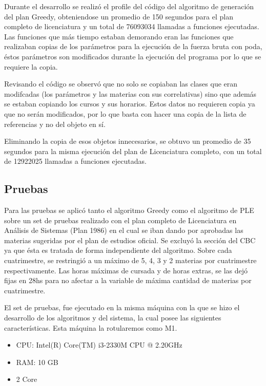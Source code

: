 \documentclass[a4paper]{article}
\begin{document}
Durante el desarrollo se realizó el profile del código del algoritmo de generación del plan Greedy, obteniendose un promedio de 150 segundos para el plan completo de licenciatura y un total de 76093034 llamadas a funciones ejecutadas. Las funciones que más tiempo estaban demorando eran las funciones que realizaban copias de los parámetros para la ejecución de la fuerza bruta con poda, éstos parámetros son modificados durante la ejecución del programa por lo que se requiere la copia.

Revisando el código se observó que no solo se copiaban las clases que eran modifcadas (los parámetros y las materias con sus correlativas) sino que además se estaban copiando los cursos y sus horarios. Estos datos no requieren copia ya que no serán modificados, por lo que basta con hacer una copia de la lista de referencias y no del objeto en sí.

Eliminando la copia de esos objetos innecesarios, se obtuvo un promedio de 35 segundos para la misma ejecución del plan de Licenciatura completo, con un total de 12922025 llamadas a funciones ejecutadas.


\subsection{Pruebas}

Para las pruebas se aplicó tanto el algoritmo Greedy como el algoritmo de PLE sobre un set de pruebas realizado con el plan completo de Licenciatura en Análisis de Sistemas (Plan 1986) en el cual se iban dando por aprobadas las materias sugeridas por el plan de estudios oficial. Se excluyó la sección del CBC ya que ésta es tratada de forma independiente del algoritmo. Sobre cada cuatrimestre, se restringió a un máximo de 5, 4, 3 y 2 materias por cuatrimestre respectivamente. Las horas máximas de cursada y de horas extras, se las dejó fijas en 28hs para no afectar a la variable de máxima cantidad de materias por cuatrimestre.

El set de pruebas, fue ejecutado en la misma máquina con la que se hizo el desarrollo de los algoritmos y del sistema, la cual posee las siguientes características. Esta máquina la rotularemos como M1.

\begin{itemize}
	\item CPU: Intel(R) Core(TM) i3-2330M CPU @ 2.20GHz
	\item RAM: 10 GB
	\item 2 Core
\end{itemize}
\end{document}
